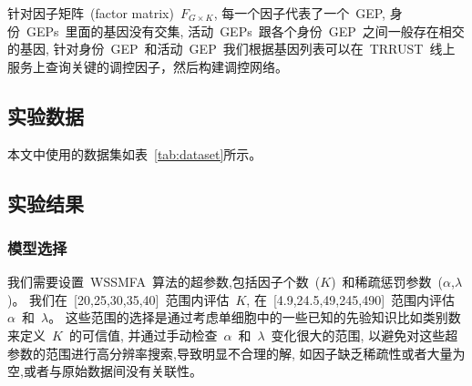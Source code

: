 针对因子矩阵~(factor matrix)~$F_{G \times K}$, 每一个因子代表了一个~GEP, 
身份~GEPs~里面的基因没有交集, 活动~GEPs~跟各个身份~GEP~之间一般存在相交的基因, 
针对身份~GEP~和活动~GEP~我们根据基因列表可以在~TRRUST~线上服务上查询关键的调控因子，然后构建调控网络。

\subsection{实验数据}
本文中使用的数据集如表~\ref{tab:dataset}所示。
\begin{table}[!htbp]
    \caption{\label{tab:dataset}The published dataset we used} 
\end{table}

\subsection{实验结果}
\subsubsection{模型选择}
我们需要设置~WSSMFA~算法的超参数,包括因子个数~($K$)~和稀疏惩罚参数~($\alpha$,$\lambda$)。
我们在~[20,25,30,35,40]~范围内评估~$K$, 在~[4.9,24.5,49,245,490]~范围内评估~$\alpha$~和~$\lambda$。
这些范围的选择是通过考虑单细胞中的一些已知的先验知识比如类别数来定义~$K$~的可信值,
并通过手动检查~$\alpha$~和~$\lambda$~变化很大的范围,
以避免对这些超参数的范围进行高分辨率搜索,导致明显不合理的解,
如因子缺乏稀疏性或者大量为空,或者与原始数据间没有关联性。


